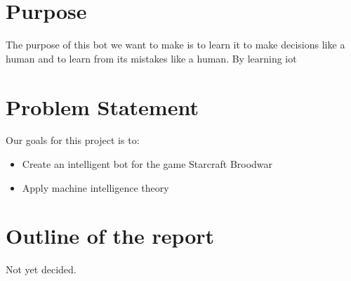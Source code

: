 

\section{Purpose}
	The purpose of this bot we want to make is to learn it to make decisions like a human and to learn from its mistakes like a human. 
	By learning iot



\section{Problem Statement}
	Our goals for this project is to:
	\begin{itemize}
		\item Create an intelligent bot for the game Starcraft Broodwar
		\item Apply machine intelligence theory
	\end{itemize}


\section{Outline of the report}
	Not yet decided.